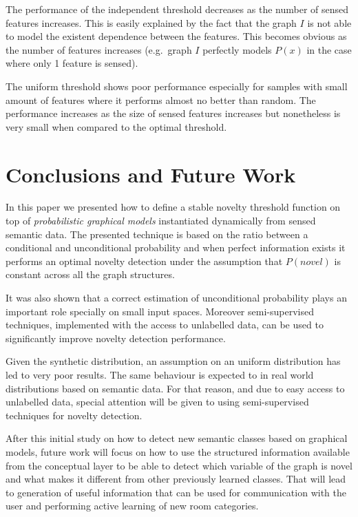 \documentclass[runningheads,a4paper]{llncs}
\begin{document}
The performance of the independent threshold decreases as the number of sensed
features increases. This is easily explained by the fact that the graph $I$ is not
able to model the existent dependence between the features. This becomes obvious
as the number of features increases (e.g.\ graph $I$ perfectly models $P(x)$ in the
case where only 1 feature is sensed).

The uniform threshold shows poor performance especially for samples with small amount of features
where it performs almost no better than random.
The performance increases as the size of sensed features increases but nonetheless
is very small when compared to the optimal threshold.


\section{Conclusions and Future Work}
\label{sec:conclusion}
In this paper we presented how to define a stable novelty threshold function on
top of \emph{probabilistic graphical models} instantiated dynamically from sensed
semantic data.
The presented technique is based on the ratio between a conditional and
unconditional probability and when perfect information exists it performs an optimal
novelty detection under the assumption that $P(novel)$ is constant across
all the graph structures.

It was also shown that a correct estimation of unconditional probability plays an
important role specially on small input spaces. Moreover semi-supervised techniques,
implemented with the access to unlabelled data, can be used to significantly improve
novelty detection performance.

Given the synthetic distribution, an assumption on an uniform
distribution has led to very poor results. The same behaviour is expected to
in real world distributions based on semantic data. For that reason,
and due to easy access to unlabelled data, special attention will be given to using
semi-supervised techniques for novelty detection.

After this initial study on how to detect new semantic classes based on
graphical models, future work will focus on how to use the structured
information available from the conceptual layer to be able to detect which variable
of the graph is novel and what makes it different from other previously learned
classes. That will lead to generation of useful information that can be used for
communication with the user and performing active learning of new room categories.




\end{document}
